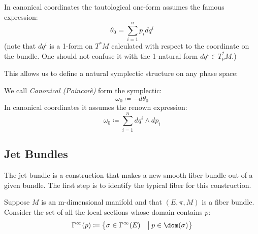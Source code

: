 \documentclass[Main]{subfiles}
\begin{document}
						In canonical coordinates the tautological one-form assumes the famous expression:
						\begin{displaymath}
							\theta_0 = \sum_{i=1}^n {p_i} d q^i
						\end{displaymath}
						(note that $d q^i$ is a 1-form on $T^*M$ calculated with respect to the coordinate on the bundle. One should not confuse it with the 1-natural form $d q^i \in T^*_p M$.)

	
					This allows us to define a natural symplectic structure on any phase space:
					\begin{definition}\label{Def:NatSymForm}
						We call \emph{Canonical (Poincarè)} form the symplectic:
						\begin{displaymath}
							\omega_0 \coloneqq -d \theta_0
						\end{displaymath}
						In canonical coordinates it assumes the renown expression:
						\begin{displaymath}
							\omega_0 \coloneqq \sum_{i=1}^n  d q^i \wedge d p_i
						\end{displaymath}
					\end{definition}
					
		\subsection{Jet Bundles}
			The jet bundle is a %
			construction that makes a new smooth fiber bundle out of a given bundle. The first step is to identify the typical fiber for this construction.

			Suppose $M$ is an m-dimensional manifold and that $(E, \pi, M)$ is a fiber bundle. 
			Consider the set of all the local sections whose domain contains $p$:
			\begin{displaymath}
				\Gamma^\infty (p) \coloneqq \big\{ \sigma \in \Gamma^\infty(E) \quad \big\vert\:  p \in \dom(\sigma)  \big\}
			\end{displaymath}
\end{document}
